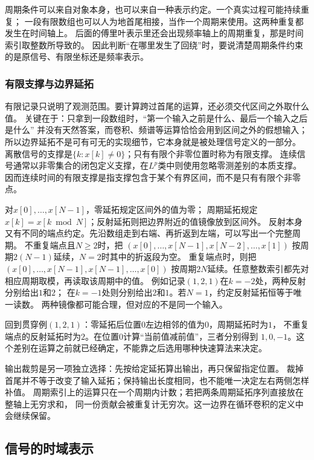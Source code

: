 周期条件可以来自对象本身，也可以来自一种表示约定。一个真实过程可能持续重复；
一段有限数组也可以人为地首尾相接，当作一个周期来使用。这两种重复都发生在时间轴上。
后面的傅里叶表示里还会出现频率轴上的周期重复，那是时间索引取整数所导致的。
因此判断“在哪里发生了回绕”时，要说清楚周期条件约束的是原信号、有限坐标还是频率表示。

\subsubsection{有限支撑与边界延拓}

有限记录只说明了观测范围。要计算跨过首尾的运算，还必须交代区间之外取什么值。
关键在于：只拿到一段数组时，“第一个输入之前是什么、最后一个输入之后是什么”
并没有天然答案，而卷积、频谱等运算恰恰会用到区间之外的假想输入；
所以边界延拓不是可有可无的实现细节，它本身就是被处理信号定义的一部分。
离散信号的支撑是$\{k:x[k]\neq0\}$；只有有限个非零位置时称为有限支撑。
连续信号通常以非零集合的闭包定义支撑，在$L^p$类中则使用忽略零测差别的本质支撑。
因而连续时间的有限支撑是指支撑包含于某个有界区间，而不是只有有限个非零点。

对$x[0],\ldots,x[N-1]$，零延拓规定区间外的值为零；
周期延拓规定$x[k]=x[k\bmod N]$；反射延拓则把边界附近的值镜像放到区间外。
反射本身又有不同的端点约定。先沿数组走到右端、再折返到左端，可以写出一个完整周期。
不重复端点且$N\geq2$时，把
$(x[0],\ldots,x[N-1],x[N-2],\ldots,x[1])$
按周期$2(N-1)$延续，$N=2$时其中的折返段为空。
重复端点时，则把$(x[0],\ldots,x[N-1],x[N-1],\ldots,x[0])$
按周期$2N$延续。任意整数索引都先对相应周期取模，再读取该周期中的值。
例如记录$(1,2,1)$在$k=-2$处，两种反射分别给出$1$和$2$；
在$k=-1$处则分别给出$2$和$1$。若$N=1$，约定反射延拓恒等于唯一读数。
两种镜像都可能合理，但对应的不是同一个输入。

回到贯穿例$(1,2,1)$：零延拓后位置$0$左边相邻的值为$0$，周期延拓时为$1$，
不重复端点的反射延拓时为$2$。在位置$0$计算“当前值减前值”，三者分别得到
$1,0,-1$。这个差别在运算之前就已经确定，不能靠之后选用哪种快速算法来决定。

输出裁剪是另一项独立选择：先按给定延拓算出输出，再只保留指定位置。
裁掉首尾并不等于改变了输入延拓；保持输出长度相同，也不能唯一决定左右两侧怎样补值。
周期索引上的运算只在一个周期内计数；若把两条周期延拓序列直接放在整轴上无穷求和，
同一份贡献会被重复计无穷次。这一边界在循环卷积的定义中会继续保留。

\subsection{信号的时域表示}
\label{sec:signal-time-impulses}

